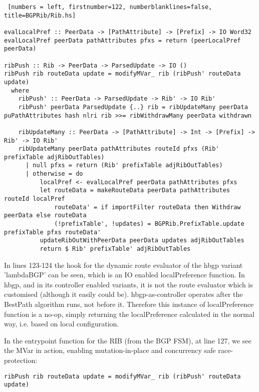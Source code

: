 \begin{lstlisting} [numbers = left, firstnumber=122, numberblanklines=false, title=BGPRib/Rib.hs]

evalLocalPref :: PeerData -> [PathAttribute] -> [Prefix] -> IO Word32
evalLocalPref peerData pathAttributes pfxs = return (peerLocalPref peerData)

ribPush :: Rib -> PeerData -> ParsedUpdate -> IO ()
ribPush rib routeData update = modifyMVar_ rib (ribPush' routeData update)
  where
    ribPush' :: PeerData -> ParsedUpdate -> Rib' -> IO Rib'
    ribPush' peerData ParsedUpdate {..} rib = ribUpdateMany peerData puPathAttributes hash nlri rib >>= ribWithdrawMany peerData withdrawn

    ribUpdateMany :: PeerData -> [PathAttribute] -> Int -> [Prefix] -> Rib' -> IO Rib'
    ribUpdateMany peerData pathAttributes routeId pfxs (Rib' prefixTable adjRibOutTables)
      | null pfxs = return (Rib' prefixTable adjRibOutTables)
      | otherwise = do
          localPref <- evalLocalPref peerData pathAttributes pfxs
          let routeData = makeRouteData peerData pathAttributes routeId localPref
              routeData' = if importFilter routeData then Withdraw peerData else routeData
              (!prefixTable', !updates) = BGPRib.PrefixTable.update prefixTable pfxs routeData'
          updateRibOutWithPeerData peerData updates adjRibOutTables
          return $ Rib' prefixTable' adjRibOutTables
\end{lstlisting}

In lines 123-124 the hook for the dynamic route evaluator of the hbgp variant 'lambdaBGP' can be seen, which is an IO enabled localPreference function.  In hbgp, and in its controller enabled variants, it is not the route evaluator which is customised (although it easily could be).  hbgp-as-controller operates after the BestPath algorithm runs, not before it.  Therefore this instance of localPreference function is a no-op, simply returning the localPreference calculated in the normal way, i.e. based on local configuration.

\bigskip

In the entrypoint function for the RIB (from the BGP FSM), at line 127, we see the MVar in action, enabling mutation-in-place and concurrency safe race-protection: 

\begin{lstlisting}[frame=none]
ribPush rib routeData update = modifyMVar_ rib (ribPush' routeData update)
\end{lstlisting}

